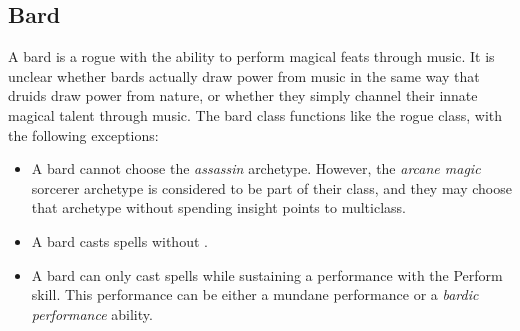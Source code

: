     \subsection{Bard}
        A bard is a rogue with the ability to perform magical feats through music.
        It is unclear whether bards actually draw power from music in the same way that druids draw power from nature, or whether they simply channel their innate magical talent through music.
        The bard class functions like the rogue class, with the following exceptions:
        \begin{itemize}
            \item A bard cannot choose the \textit{assassin} archetype. However, the \textit{arcane magic} sorcerer archetype is considered to be part of their class, and they may choose that archetype without spending insight points to multiclass.
            \item A bard casts spells without .
            \item A bard can only cast spells while sustaining a performance with the Perform skill. This performance can be either a mundane performance or a \textit{bardic performance} ability.
        \end{itemize}

